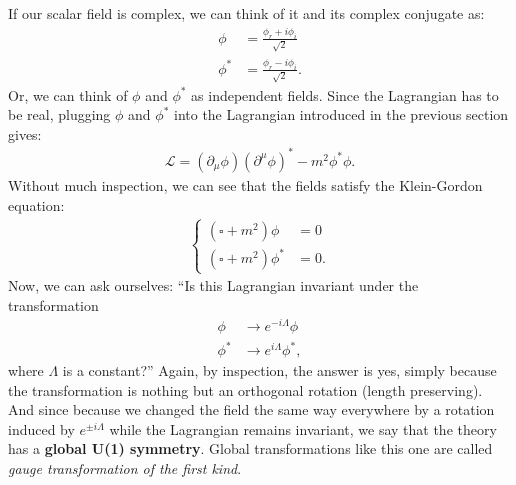 \documentclass[a4paper,11pt]{article}
\numberwithin{equation}{section}
\theoremstyle{definition}
\newcommand{\p}{\partial}
\newcommand{\lag}{\mathcal{L}}
\begin{document}
If our scalar field is complex, we can think of it and its complex conjugate as:
\begin{align}
\phi &= \frac{\phi_r + i\phi_i}{\sqrt{2}}\\
\phi^* &= \frac{\phi_r - i\phi_i}{\sqrt{2}}.
\end{align}
Or, we can think of $\phi$ and $\phi^*$ as independent fields. Since the Lagrangian has to be real, plugging $\phi$ and $\phi^*$ into the Lagrangian introduced in the previous section gives:
\begin{align}
\lag = (\p_\mu \phi)(\p^\mu \phi)^* - m^2\phi^*\phi.
\end{align}
Without much inspection, we can see that the fields satisfy the Klein-Gordon equation:
\begin{align}
\begin{cases}
(\square + m^2)\phi &= 0\\
(\square + m^2)\phi^* &= 0.
\end{cases}
\end{align}
Now, we can ask ourselves: ``Is this Lagrangian invariant under the transformation
\begin{align}
\phi &\to e^{-i\Lambda}\phi\\
\phi^* &\to e^{i\Lambda}\phi^*,
\end{align}
where $\Lambda$ is a constant?'' Again, by inspection, the answer is yes, simply because the transformation is nothing but an orthogonal rotation (length preserving). And since because we changed the field the same way everywhere by a rotation induced by $e^{\pm i\Lambda}$ while the Lagrangian remains invariant, we say that the theory has a \textbf{global U(1) symmetry}. Global transformations like this one are called \textit{gauge transformation of the first kind}.
\end{document}
